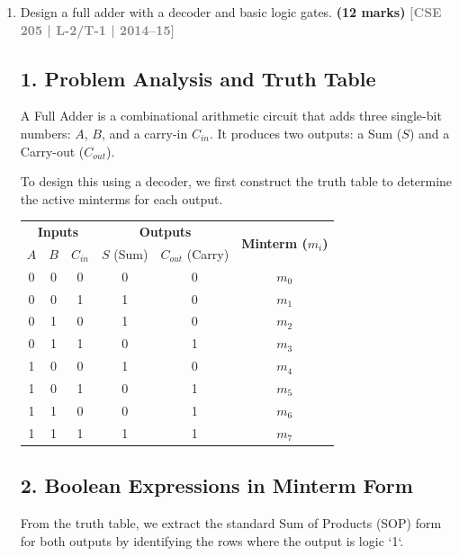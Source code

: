 \documentclass[12pt,a3paper]{article}
\newcommand{\yr}[1]{\hfill\textcolor{gray}{\small\textbf{[#1]}}}
\newcommand{\mk}[1]{\textcolor{orange!70!black}{\small\textbf{(#1 marks)}}}
\begin{document}
\begin{enumerate}
\begin{tcolorbox}[enhanced,breakable,ansbox,colback=cD!4,colframe=cD,boxrule=0.8pt,arc=5pt,title={\textbf{Answer}},fonttitle=\bfseries\color{white},colbacktitle=cD]
\begin{center}
\begin{circuitikz}[scale=0.9, transform shape]
\end{circuitikz}
\end{center}

\end{tcolorbox}

\item Design a full adder with a decoder and basic logic gates.
\mk{12} \yr{CSE 205 | L-2/T-1 | 2014--15}

\begin{tcolorbox}[enhanced,breakable,ansbox,colback=cD!4,colframe=cD,boxrule=0.8pt,arc=5pt,title={\textbf{Answer}},fonttitle=\bfseries\color{white},colbacktitle=cD]

\subsection*{1. Problem Analysis and Truth Table}
A Full Adder is a combinational arithmetic circuit that adds three single-bit numbers: $A$, $B$, and a carry-in $C_{in}$. It produces two outputs: a Sum ($S$) and a Carry-out ($C_{out}$). 

To design this using a decoder, we first construct the truth table to determine the active minterms for each output.

\begin{center}
\renewcommand{\arraystretch}{1.2}
\begin{tabular}{ccc|cc|c}
\toprule
\multicolumn{3}{c|}{\textbf{Inputs}} & \multicolumn{2}{c|}{\textbf{Outputs}} & \multirow{2}{*}{\textbf{Minterm ($m_i$)}} \\
$A$ & $B$ & $C_{in}$ & $S$ (Sum) & $C_{out}$ (Carry) & \\
\midrule
0 & 0 & 0 & 0 & 0 & $m_0$ \\
0 & 0 & 1 & 1 & 0 & $m_1$ \\
0 & 1 & 0 & 1 & 0 & $m_2$ \\
0 & 1 & 1 & 0 & 1 & $m_3$ \\
1 & 0 & 0 & 1 & 0 & $m_4$ \\
1 & 0 & 1 & 0 & 1 & $m_5$ \\
1 & 1 & 0 & 0 & 1 & $m_6$ \\
1 & 1 & 1 & 1 & 1 & $m_7$ \\
\bottomrule
\end{tabular}
\end{center}

\subsection*{2. Boolean Expressions in Minterm Form}
From the truth table, we extract the standard Sum of Products (SOP) form for both outputs by identifying the rows where the output is logic `1`.


\end{tcolorbox}
\end{enumerate}
\end{document}
